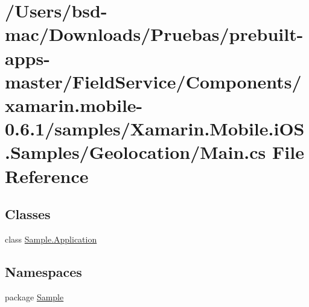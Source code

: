 \hypertarget{_components_2xamarin_8mobile-0_86_81_2samples_2_xamarin_8_mobile_8i_o_s_8_samples_2_geolocation_2_main_8cs}{\section{/\+Users/bsd-\/mac/\+Downloads/\+Pruebas/prebuilt-\/apps-\/master/\+Field\+Service/\+Components/xamarin.mobile-\/0.6.1/samples/\+Xamarin.Mobile.\+i\+O\+S.\+Samples/\+Geolocation/\+Main.cs File Reference}
\label{_components_2xamarin_8mobile-0_86_81_2samples_2_xamarin_8_mobile_8i_o_s_8_samples_2_geolocation_2_main_8cs}
}
\subsection*{Classes}
\begin{DoxyCompactItemize}
\item 
class \hyperlink{class_sample_1_1_application}{Sample.\+Application}
\end{DoxyCompactItemize}
\subsection*{Namespaces}
\begin{DoxyCompactItemize}
\item 
package \hyperlink{namespace_sample}{Sample}
\end{DoxyCompactItemize}
